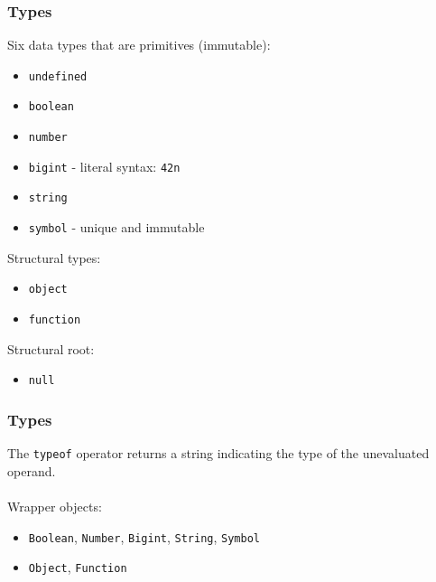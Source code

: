 \begin{frame}[fragile]
  \frametitle{Types}
Six data types that are primitives (immutable):
\begin{itemize}
  \item  \verb|undefined|
  \item  \verb|boolean|
  \item  \verb|number|
  \item  \verb|bigint| - literal syntax: \verb|42n|
  \item  \verb|string|
  \item  \verb|symbol| - unique and immutable
\end{itemize}
Structural types:
\begin{itemize}
  \item  \verb|object|
  \item  \verb|function|
\end{itemize}
Structural root:
\begin{itemize}
  \item  \verb|null|
\end{itemize}
\end{frame}

\begin{frame}[fragile]
  \frametitle{Types}
The \verb|typeof| operator returns a string indicating the type of the unevaluated operand.
\\ \vspace{5 mm}
\\ \vspace{5 mm}
Wrapper objects:
\begin{itemize}
  \item  \verb|Boolean|, \verb|Number|, \verb|Bigint|, \verb|String|, \verb|Symbol|
  \item  \verb|Object|, \verb|Function|
\end{itemize}
\vspace{5 mm}
\end{frame}

